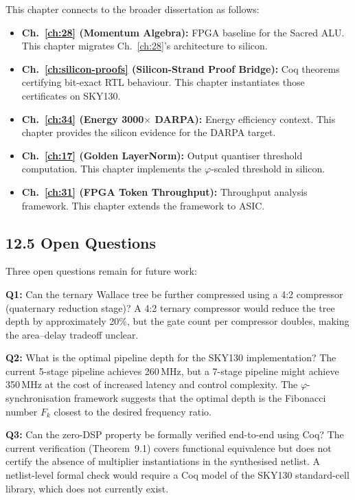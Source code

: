 This chapter connects to the broader dissertation as follows:

\begin{itemize}
\tightlist
\item \textbf{Ch.~\ref{ch:28} (Momentum Algebra):} FPGA baseline for
      the Sacred ALU. This chapter migrates Ch.~\ref{ch:28}'s
      architecture to silicon.
\item \textbf{Ch.~\ref{ch:silicon-proofs} (Silicon-Strand Proof Bridge):}
      Coq theorems certifying bit-exact RTL behaviour. This chapter
      instantiates those certificates on SKY130.
\item \textbf{Ch.~\ref{ch:34} (Energy 3000$\times$ DARPA):} Energy
      efficiency context. This chapter provides the silicon evidence
      for the DARPA target.
\item \textbf{Ch.~\ref{ch:17} (Golden LayerNorm):} Output quantiser
      threshold computation. This chapter implements the
      \(\varphi\)-scaled threshold in silicon.
\item \textbf{Ch.~\ref{ch:31} (FPGA Token Throughput):} Throughput
      analysis framework. This chapter extends the framework to ASIC.
\end{itemize}

\subsection{12.5 Open Questions}

Three open questions remain for future work:

\textbf{Q1:} Can the ternary Wallace tree be further compressed using
a 4:2 compressor (quaternary reduction stage)? A 4:2 ternary
compressor would reduce the tree depth by approximately 20\%, but the
gate count per compressor doubles, making the area--delay tradeoff
unclear.

\textbf{Q2:} What is the optimal pipeline depth for the SKY130
implementation? The current 5-stage pipeline achieves 260\,MHz, but
a 7-stage pipeline might achieve 350\,MHz at the cost of increased
latency and control complexity. The \(\varphi\)-synchronisation
framework suggests that the optimal depth is the Fibonacci number
\(F_k\) closest to the desired frequency ratio.

\textbf{Q3:} Can the zero-DSP property be formally verified end-to-end
using Coq? The current verification (Theorem~9.1) covers functional
equivalence but does not certify the absence of multiplier
instantiations in the synthesised netlist. A netlist-level formal
check would require a Coq model of the SKY130 standard-cell library,
which does not currently exist.

